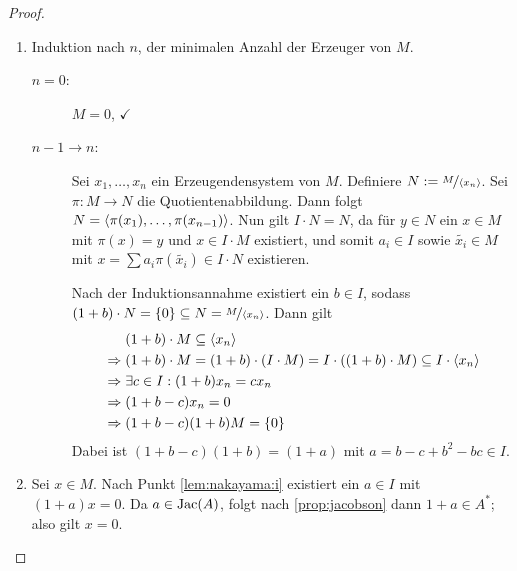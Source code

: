 \documentclass[12pt,a4paper]{scrartcl}
\theoremstyle{cplain}
\theoremstyle{cdef}
\begin{document}
\begin{proof}
	\leavevmode
	\begin{enumerate}[label=\ref{lem:nakayama:\roman*}]
		\item Induktion nach $n$, der minimalen Anzahl der Erzeuger von $M$.
        \begin{description}
            \item[$n = 0$:] $M = 0$, $\checkmark$
            \item[$n-1\to n$:] Sei $x_1,\dots, x_n$ ein Erzeugendensystem von $M$. Definiere $N := \nicefrac{M}{\langle x_n\rangle}$. Sei $\pi \colon M\to N$ die Quotientenabbildung. Dann folgt $N = \langle\pi(x_1),\dots,\pi(x_{n-1})\rangle$. Nun gilt $I\cdot N = N$, da für $y\in N$ ein $x\in M$ mit $\pi(x) = y$ und $x\in I\cdot M$ existiert, und somit $a_i\in I$ sowie $\tilde{x_i}\in M$ mit $x =\sum a_i\pi(\tilde{x_i})\in I\cdot N$ existieren.
		
            Nach der Induktionsannahme existiert ein $b\in I$, sodass $(1+b)\cdot N = \{0\}\subseteq N = \nicefrac{M}{\langle x_n\rangle}$. Dann gilt
            \begin{align*}
                &\phantom{{}\Rightarrow{}}(1+b)\cdot M\subseteq \<x_n\>\\
                &\Rightarrow (1+b)\cdot M = (1+b)\cdot (I\cdot M) = I\cdot((1+b)\cdot M)\subseteq I \cdot \<x_n\>\\
                &\Rightarrow \exists c\in I: (1+b) x_n = cx_n \\
                &\Rightarrow (1+b-c)x_n = 0\\
                &\Rightarrow (1+b-c)(1+b)M = \{0\}
            \end{align*}
            Dabei ist $(1+b-c)(1+b) = (1+a)$ mit $a = b-c+b^2-bc\in I$.
        \end{description}
        \item Sei $x\in M$. Nach Punkt \ref{lem:nakayama:i} existiert ein $a\in I$ mit $(1+a)x = 0$. Da $a\in \operatorname{Jac}(A)$, folgt nach \cref{prop:jacobson} dann $1+a\in A^{*}$; also gilt $x = 0$.
        \qedhere
	\end{enumerate}
\end{proof}

\end{document}

